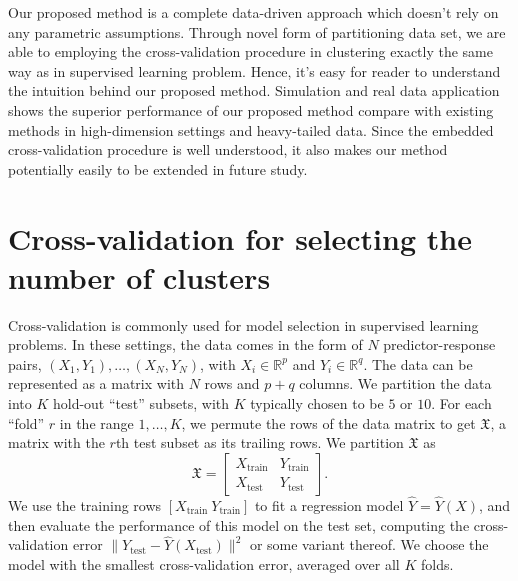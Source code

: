 \documentclass[11pt]{article}
\newcommand{\R}{\mathbb{R}}
\newcommand{\dataX}{\mathfrak{X}}
\newcommand{\Xtrain}{X_{\text{train}}}
\newcommand{\Ytrain}{Y_{\text{train}}}
\newcommand{\Xtest}{X_{\text{test}}}
\newcommand{\Ytest}{Y_{\text{test}}}
\begin{document}
Our proposed method is a complete data-driven approach which doesn't rely on
any parametric assumptions. Through novel form of partitioning data set, we
are able to employing the cross-validation procedure in clustering exactly the
same way as in supervised learning problem. Hence, it's easy for reader to
understand the intuition behind our proposed method. Simulation and real data
application shows the superior performance of our proposed method compare with
existing methods in high-dimension settings and heavy-tailed data. Since the
embedded cross-validation procedure is well understood, it also makes our
method potentially easily to be extended in future study. 
 


\section{Cross-validation for selecting the number of clusters}

Cross-validation is commonly used for model selection in supervised learning
problems.  In these settings, the data comes in the form of $N$
predictor-response pairs, $(X_1, Y_1), \dotsc, (X_N, Y_N)$, with $X_i \in
\R^{p}$ and $Y_i \in \R^{q}$.  The data can be represented as a matrix with
$N$ rows and $p + q$ columns.  We partition the data into $K$ hold-out
``test'' subsets, with $K$ typically chosen to be $5$ or $10$.  For each
``fold'' $r$ in the range $1, \dotsc, K$, we permute the rows of the data
matrix to get $\dataX$, a matrix with the $r$th test subset as its trailing
rows.  We partition $\dataX$ as
\[
  \dataX =
  \begin{bmatrix}
    \Xtrain & \Ytrain \\
    \Xtest  & \Ytest
  \end{bmatrix}.
\]
We use the training rows $[ \Xtrain\ \Ytrain ]$ to fit a regression model
$\hat Y = \hat Y(X)$, and then evaluate the performance of this model on the
test set, computing the cross-validation error $\|\Ytest - \hat Y(\Xtest)\|^2$
or some variant thereof.  We choose the model with the smallest
cross-validation error, averaged over all $K$ folds.
\end{document}
